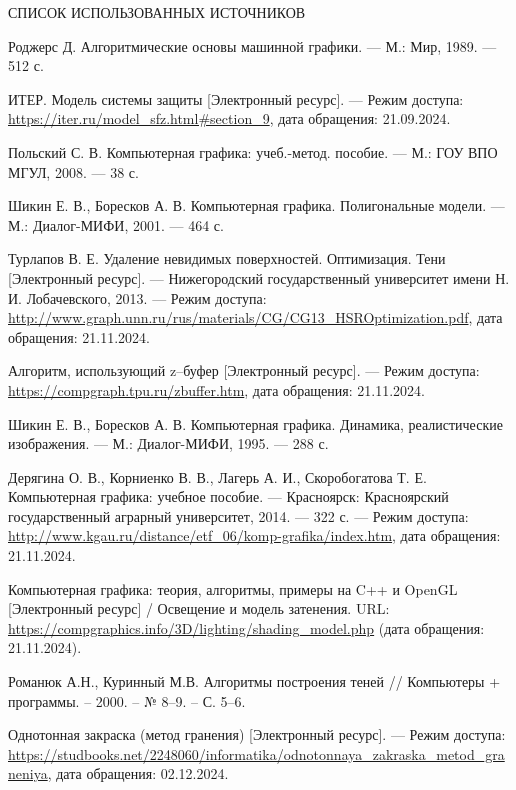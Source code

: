 \begin{center}
    \MakeUppercase{\large Список использованных источников}
\end{center}

\renewcommand{\refname}{}
\vspace{-11mm}

\makeatletter
\renewcommand\@biblabel[1]{#1.} %
\makeatother

\begin{thebibliography}{9} 
    Роджерс Д. Алгоритмические основы машинной графики. — М.: Мир, 1989. — 512 с.
    
    ИТЕР. Модель системы защиты [Электронный ресурс]. — Режим доступа: \url{https://iter.ru/model_sfz.html#section_9}, дата обращения: 21.09.2024.
    
    Польский С. В. Компьютерная графика: учеб.-метод. пособие. — М.: ГОУ ВПО МГУЛ, 2008. — 38 с.
    
    Шикин Е. В., Боресков А. В. Компьютерная графика. Полигональные модели. — М.: Диалог-МИФИ, 2001. — 464 с.
    
    Турлапов В. Е. Удаление невидимых поверхностей. Оптимизация. Тени [Электронный ресурс]. — Нижегородский государственный университет имени Н. И. Лобачевского, 2013. — Режим доступа: \url{http://www.graph.unn.ru/rus/materials/CG/CG13_HSROptimization.pdf}, дата обращения: 21.11.2024.
    
    Алгоритм, использующий z–буфер [Электронный ресурс]. — Режим доступа: \url{https://compgraph.tpu.ru/zbuffer.htm}, дата обращения: 21.11.2024.
    
    Шикин Е. В., Боресков А. В. Компьютерная графика. Динамика, реалистические изображения. — М.: Диалог-МИФИ, 1995. — 288 с.
    
    Дерягина О. В., Корниенко В. В., Лагерь А. И., Скоробогатова Т. Е. Компьютерная графика: учебное пособие. — Красноярск: Красноярский государственный аграрный университет, 2014. — 322 с. — Режим доступа: \url{http://www.kgau.ru/distance/etf_06/komp-grafika/index.htm}, дата обращения: 21.11.2024.
    
Компьютерная графика: теория, алгоритмы, примеры на C++ и OpenGL [Электронный ресурс] / Освещение и модель затенения. URL: \url{https://compgraphics.info/3D/lighting/shading_model.php} (дата обращения: 21.11.2024).

Романюк А.Н., Куринный М.В. 
Алгоритмы построения теней // Компьютеры + программы. – 2000. – № 8–9. – С. 5–6.

Однотонная закраска (метод гранения) [Электронный ресурс]. — Режим доступа: \url{https://studbooks.net/2248060/informatika/odnotonnaya_zakraska_metod_graneniya}, дата обращения: 02.12.2024.
    
\end{thebibliography}

